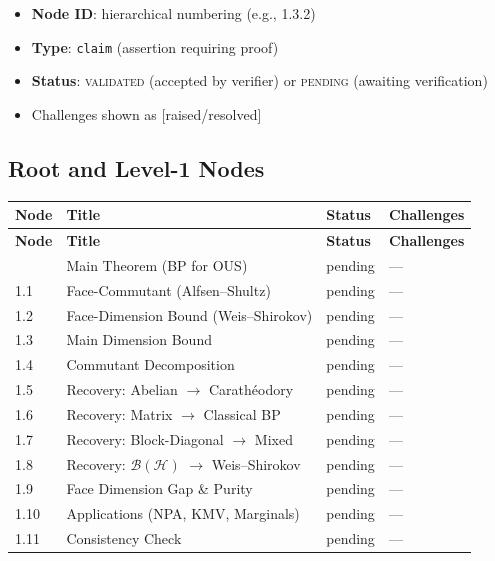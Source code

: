 \documentclass[11pt,a4paper]{article}
\theoremstyle{plain}
\theoremstyle{definition}
\theoremstyle{remark}
\newcommand{\Hilbert}{\mathcal{H}}
\newcommand{\BH}{\mathcal{B}(\Hilbert)}
\begin{document}
\begin{tcolorbox}[colback=blue!5!white, colframe=blue!50!black,
  title={\textbf{Proof Tree Legend}}]
\begin{itemize}[nosep]
  \item \textbf{Node ID}: hierarchical numbering (e.g., 1.3.2)
  \item \textbf{Type}: \texttt{claim} (assertion requiring proof)
  \item \textbf{Status}: \textsc{validated} (accepted by verifier)
        or \textsc{pending} (awaiting verification)
  \item Challenges shown as {[raised/resolved]}
\end{itemize}
\end{tcolorbox}

\subsection{Root and Level-1 Nodes}

\begin{longtable}{llll}
\toprule
\textbf{Node} & \textbf{Title} & \textbf{Status} & \textbf{Challenges} \\
\midrule
\endfirsthead
\toprule
\textbf{Node} & \textbf{Title} & \textbf{Status} & \textbf{Challenges} \\
\midrule
\endhead
\bottomrule
\endlastfoot
1     & Main Theorem (BP for OUS) & pending & --- \\
1.1   & Face-Commutant (Alfsen--Shultz) & pending & --- \\
1.2   & Face-Dimension Bound (Weis--Shirokov) & pending & --- \\
1.3   & Main Dimension Bound & pending & --- \\
1.4   & Commutant Decomposition & pending & --- \\
1.5   & Recovery: Abelian $\to$ Carath\'eodory & pending & --- \\
1.6   & Recovery: Matrix $\to$ Classical BP & pending & --- \\
1.7   & Recovery: Block-Diagonal $\to$ Mixed & pending & --- \\
1.8   & Recovery: $\BH$ $\to$ Weis--Shirokov & pending & --- \\
1.9   & Face Dimension Gap \& Purity & pending & --- \\
1.10  & Applications (NPA, KMV, Marginals) & pending & --- \\
1.11  & Consistency Check & pending & --- \\
\end{longtable}
\end{document}
